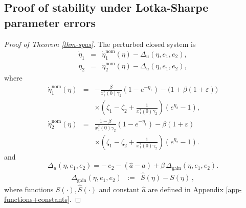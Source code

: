 \documentclass[journal,twoside,web]{ieeecolor}
\begin{document}
\subsection{Proof of stability under Lotka-Sharpe parameter errors}

\begin{proof}[Proof of Theorem \ref{thm-spas}]
The perturbed closed system is
\begin{eqnarray}
\dot\eta_1 &=& \dot\eta_1^{\mathrm{nom}}(\eta)-\Delta_u(\eta,e_1,e_2), \\
\dot\eta_2 &=& \dot\eta_2^{\mathrm{nom}}(\eta)-\Delta_u(\eta,e_1,e_2),
\end{eqnarray}
where
\begin{eqnarray}
\dot\eta_1^{\mathrm{nom}}(\eta)
&=&
-\frac{\beta}{x_1^*(0)\gamma_2}(1-e^{-\eta_1})
-
\bigl(1+\beta(1+\varepsilon)\bigr) \nonumber \\ &&\times 
\left(\zeta_1-\zeta_2+\frac{1}{x_1^*(0)\gamma_2}\right)(e^{\eta_2}-1), \\
\dot\eta_2^{\mathrm{nom}}(\eta)
&=&
\frac{1-\beta}{x_1^*(0)\gamma_2}(1-e^{-\eta_1})
-
\beta(1+\varepsilon) \nonumber \\ && \times 
\left(\zeta_1-\zeta_2+\frac{1}{x_1^*(0)\gamma_2}\right)(e^{\eta_2}-1).
\end{eqnarray}
and
\begin{equation}
\Delta_u(\eta,e_1,e_2)=-\,e_2-(\hat a-a)+\beta\,\Delta_{\mathrm{gain}}(\eta,e_1,e_2).
\end{equation}
\begin{eqnarray}
\Delta_{\mathrm{gain}}(\eta,e_1,e_2)&:=& \hat S(\eta)-S(\eta)
\,,
\end{eqnarray}
where functions $S(\cdot), \hat S(\cdot)$ and constant $\hat a$ are defined in Appendix \ref{app-functions+constants}. 


\end{proof}
\end{document}
